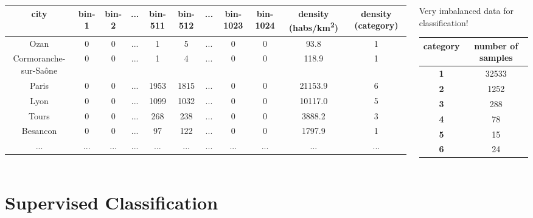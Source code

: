 \documentclass[c]{beamer}
\begin{document}
\begin{frame}
\begin{columns}
\begin{column}{0.8\textwidth}
\begin{table}
\begin{center}
\begin{adjustbox}{max width=0.9\textwidth}
\begin{tabular}{|c|c|c|c|c|c|c|c|c|c|c|}
\hline 
city &  bin-1 & bin-2 & ... & bin-511 & bin-512 &... & bin-1023 & bin-1024 & density (habs/km\textsuperscript{2})  & density (category)\\
\hline 
Ozan & 0 & 0 & ... & 1 & 5 & ... & 0 & 0 & 93.8 & 1\\
\hline 
Cormoranche-sur-Sa\^{o}ne & 0 & 0 & ... & 1 & 4 & ... & 0 & 0 & 118.9 & 1\\
\hline 
Paris & 0 & 0 & ... & 1953 & 1815 & ... & 0 & 0 & 21153.9 & 6\\
\hline
Lyon & 0 & 0 & ... & 1099 & 1032 & ... & 0 & 0 & 10117.0 & 5\\
\hline
Tours & 0 & 0 & ... & 268 & 238 & ... & 0 & 0 & 3888.2 & 3\\
\hline
Besancon & 0 & 0 & ... & 97 & 122 & ... & 0 & 0 & 1797.9 & 1\\
\hline 
... & ... & ... & ... & ... & ... & ... & ... & ... & ... & ... \\
\hline
\end{tabular}
\end{adjustbox}
\end{center}
\end{table}
\end{column}
\begin{column}{0.35\textwidth}
{\tiny
\begin{alertblock}{Very imbalanced data for classification!}
\begin{table}
 \begin{tabular}{|c|c|}
  \hline
  category & number of samples\\
  \hline
  \textbf{1} & 32533\\
  \hline
  \textbf{2} & 1252\\
  \hline
  \textbf{3} & 288\\
  \hline
  \textbf{4} & 78\\
  \hline
  \textbf{5} & 15\\
  \hline
  \textbf{6} & 24 \\
  \hline
 \end{tabular}
\end{table}
\end{alertblock}
}
\end{column}
\end{columns}
\end{frame}

\section{Supervised Classification}
\end{document}

